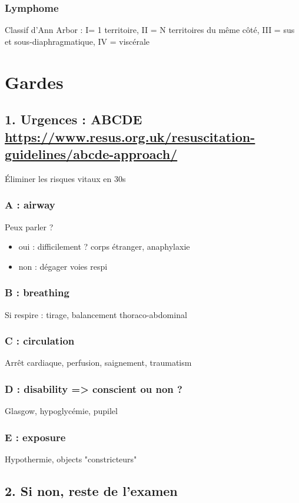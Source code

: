\documentclass[11pt]{article}
\begin{document}
\subsubsection{Lymphome}
\label{sec:orga4589cb}
Classif d'Ann Arbor : I= 1 territoire, II = N territoires du même côté, III =
sus et sous-diaphragmatique, IV = viscérale
\section{Gardes}
\label{sec:orgb81a63d}
\subsection{1. Urgences : ABCDE \url{https://www.resus.org.uk/resuscitation-guidelines/abcde-approach/}}
\label{sec:org43027a3}
Éliminer les risques vitaux en 30s
\subsubsection{A : airway}
\label{sec:orgd94ae2e}
Peux parler ?
\begin{itemize}
\item oui : difficilement ? corps étranger, anaphylaxie
\item non : dégager voies respi
\end{itemize}
\subsubsection{B : breathing}
\label{sec:org1bdc52e}
Si respire : tirage, balancement thoraco-abdominal
\subsubsection{C : circulation}
\label{sec:org996aae3}
Arrêt cardiaque, perfusion, saignement, traumatism
\subsubsection{D : disability => conscient ou non ?}
\label{sec:orgb6046a1}
Glasgow, hypoglycémie, pupilel
\subsubsection{E : exposure}
\label{sec:org15ecd59}
Hypothermie, objects "constricteurs"

\subsection{2. Si non, reste de l'examen}
\label{sec:orgca5b79f}
\end{document}
